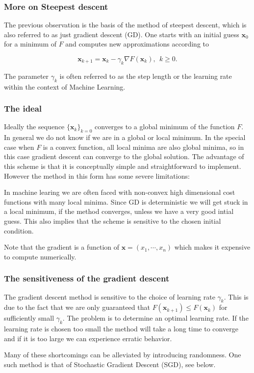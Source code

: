 \documentclass{beamer}
\begin{document}
\begin{frame}
\frametitle{More on Steepest descent}

The previous observation is the basis of the method of steepest
descent, which is also referred to as just gradient descent (GD). One
starts with an initial guess $\mathbf{x}_0$ for a minimum of $F$ and
computes new approximations according to

\[
\mathbf{x}_{k+1} = \mathbf{x}_k - \gamma_k \nabla F(\mathbf{x}_k), \ \ k \geq 0.
\]

The parameter $\gamma_k$ is often referred to as the step length or
the learning rate within the context of Machine Learning.
\end{frame}

\begin{frame}
\frametitle{The ideal}

Ideally the sequence $\{\mathbf{x}_k \}_{k=0}$ converges to a global
minimum of the function $F$. In general we do not know if we are in a
global or local minimum. In the special case when $F$ is a convex
function, all local minima are also global minima, so in this case
gradient descent can converge to the global solution. The advantage of
this scheme is that it is conceptually simple and straightforward to
implement. However the method in this form has some severe
limitations:

In machine learing we are often faced with non-convex high dimensional
cost functions with many local minima. Since GD is deterministic we
will get stuck in a local minimum, if the method converges, unless we
have a very good intial guess. This also implies that the scheme is
sensitive to the chosen initial condition.

Note that the gradient is a function of $\mathbf{x} =
(x_1,\cdots,x_n)$ which makes it expensive to compute numerically.
\end{frame}

\begin{frame}
\frametitle{The sensitiveness of the gradient descent}

The gradient descent method 
is sensitive to the choice of learning rate $\gamma_k$. This is due
to the fact that we are only guaranteed that $F(\mathbf{x}_{k+1}) \leq
F(\mathbf{x}_k)$ for sufficiently small $\gamma_k$. The problem is to
determine an optimal learning rate. If the learning rate is chosen too
small the method will take a long time to converge and if it is too
large we can experience erratic behavior.

Many of these shortcomings can be alleviated by introducing
randomness. One such method is that of Stochastic Gradient Descent
(SGD), see below.
\end{frame}
\end{document}
